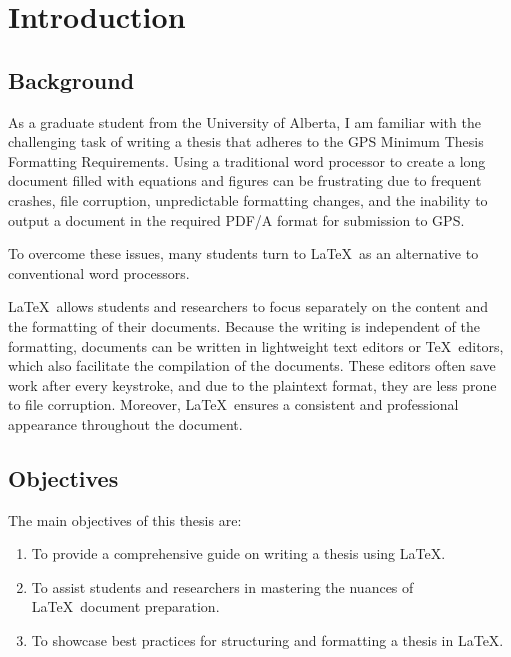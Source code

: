 \chapter{Introduction}\label{ch:Introduction}
	\section{Background}
		As a graduate student from the University of Alberta, I am familiar with the challenging task of writing a thesis that adheres to the GPS Minimum Thesis Formatting Requirements. 
		Using a traditional word processor to create a long document filled with equations and figures can be frustrating due to frequent crashes, file corruption, unpredictable formatting changes, and the inability to output a document in the required PDF/A format for submission to GPS.
		
		To overcome these issues, many students turn to \LaTeX\ as an alternative to conventional word processors. 
		
		\LaTeX\ allows students and researchers to focus separately on the content and the formatting of their documents. 
		Because the writing is independent of the formatting, documents can be written in lightweight text editors or \TeX\ editors, which also facilitate the compilation of the documents. 
		These editors often save work after every keystroke, and due to the plaintext format, they are less prone to file corruption.
		Moreover, \LaTeX\ ensures a consistent and professional appearance throughout the document. 

	\section{Objectives}
		The main objectives of this thesis are:
		\begin{enumerate}
			\item To provide a comprehensive guide on writing a thesis using \LaTeX.
			\item To assist students and researchers in mastering the nuances of \LaTeX\ document preparation.
			\item To showcase best practices for structuring and formatting a thesis in \LaTeX.
		\end{enumerate}

